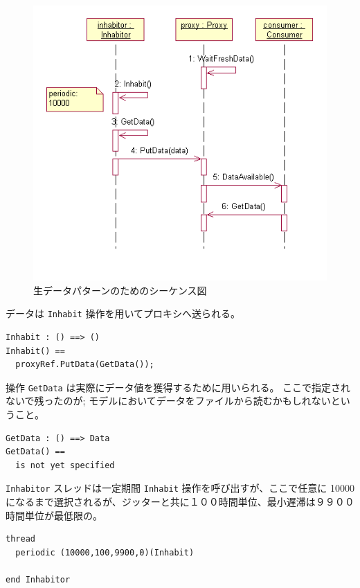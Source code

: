 \documentclass[\pformat,12pt]{jreport}
\begin{document}
\begin{figure}
\begin{center}
\includegraphics[width=\textwidth]{freshdataseqdiag}
\end{center}
\caption{生データパターンのためのシーケンス図\label{fig:seqdiafresh} }
\end{figure}

データは \texttt{Inhabit} 操作を用いてプロキシへ送られる。

\begin{lstlisting}
Inhabit : () ==> ()
Inhabit() ==
  proxyRef.PutData(GetData());
\end{lstlisting}

操作 \texttt{GetData} は実際にデータ値を獲得するために用いられる。
ここで指定されないで残ったのが; モデルにおいてデータをファイルから読むかもしれないということ。

\begin{lstlisting}
GetData : () ==> Data
GetData() ==
  is not yet specified
\end{lstlisting}

 \texttt{Inhabitor} スレッドは一定期間 \texttt{Inhabit} 操作を呼び出すが、ここで任意に 10000 になるまで選択されるが、ジッターと共に１００時間単位、最小遅滞は９９００時間単位が最低限の。

\begin{lstlisting}
thread
  periodic (10000,100,9900,0)(Inhabit)

end Inhabitor
\end{lstlisting}
\end{document}
